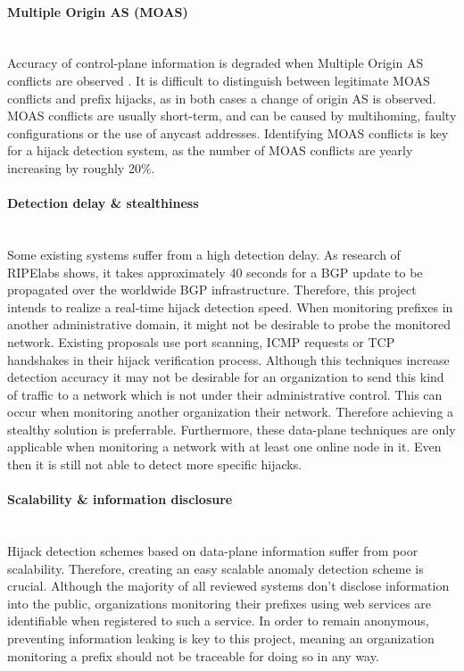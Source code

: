 \paragraph{Multiple Origin AS (MOAS)}\mbox{}\\
Accuracy of control-plane information is degraded when Multiple Origin AS conflicts are observed \cite{zheng2007light}. It is difficult to distinguish between legitimate MOAS conflicts and prefix hijacks, as in both cases a change of origin AS is observed. MOAS conflicts are usually short-term, and can be caused by multihoming, faulty configurations or the use of anycast addresses\cite{zhao2001analysis}. Identifying MOAS conflicts is key for a hijack detection system, as the number of MOAS conflicts are yearly increasing by roughly 20\%\cite{zhao2001analysis}.

\paragraph{Detection delay \& stealthiness}\mbox{}\\
Some existing systems suffer from a high detection delay\cite{shi2012detecting}. As research of RIPElabs shows, it takes approximately 40 seconds for a BGP update to be propagated over the worldwide BGP infrastructure\cite{ripelabsbgpupdates}. Therefore, this project intends to realize a real-time hijack detection speed. When monitoring prefixes in another administrative domain, it might not be desirable to probe the monitored network. Existing proposals use port scanning, ICMP requests or TCP handshakes in their hijack verification process\cite{hu2007accurate,zhang2008ispy,zheng2007light}. Although this techniques increase detection accuracy it may not be desirable for an organization to send this kind of traffic to a network which is not under their administrative control. This can occur when monitoring another organization their network. Therefore achieving a stealthy solution is preferrable. Furthermore, these data-plane techniques are only applicable when monitoring a network with at least one online node in it. Even then it is still not able to detect more specific hijacks.

\paragraph{Scalability \& information disclosure}\mbox{}\\
Hijack detection schemes based on data-plane information suffer from poor scalability\cite{shi2012detecting}. Therefore, creating an easy scalable anomaly detection scheme is crucial. Although the majority of all reviewed systems don't disclose information into the public, organizations monitoring their prefixes using web services are identifiable when registered to such a service. In order to remain anonymous, preventing information leaking is key to this project, meaning an organization monitoring a prefix should not be traceable for doing so in any way.

